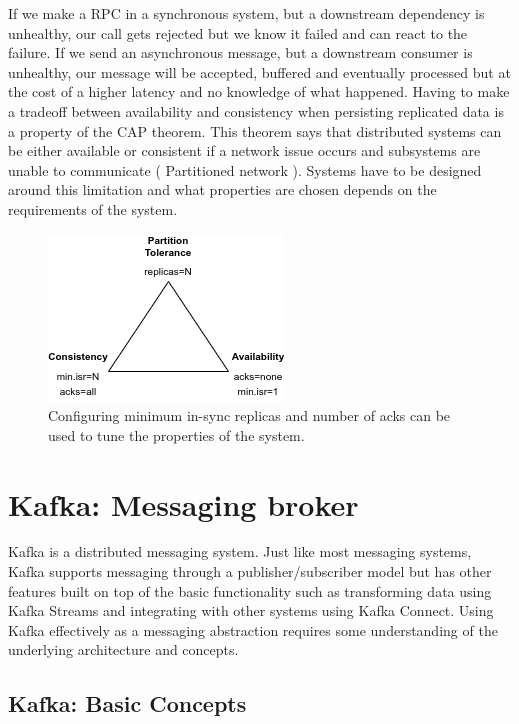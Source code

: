 \documentclass[11pt]{article}
\begin{document}
If we make a RPC in a synchronous system, but a downstream dependency is unhealthy, our call gets rejected but we know it failed and can react to the failure.
If we send an asynchronous message, but a downstream consumer is unhealthy, our message will be accepted, buffered and eventually processed but at the cost of a higher latency and no knowledge of what happened.
\newline
\newline
Having to make a tradeoff between availability and consistency when persisting replicated data is a property of the CAP theorem. This theorem says that distributed systems can be either available or consistent if a network issue occurs and subsystems are unable to communicate ( Partitioned network ). Systems have to be designed around this limitation and what properties are chosen depends on the requirements of the system.


\vspace{15pt}
\begin{figure}[htbp]
\centerline{\includegraphics[scale=1]{assets/cap.png}}
\caption{ Configuring minimum in-sync replicas and number of acks can be used to tune the properties of the system.}
\label{fig}
\end{figure}
\clearpage

\section{Kafka: Messaging broker}

Kafka is a distributed messaging system. Just like most messaging systems, Kafka supports messaging through a publisher/subscriber model but has other features built on top of the basic functionality such as transforming data using Kafka Streams\cite{kafka-stream} and integrating with other systems using Kafka Connect\cite{kafka-connect}. Using Kafka effectively as a messaging abstraction requires some understanding of the underlying architecture and concepts.

\subsection{Kafka: Basic Concepts}
\end{document}
